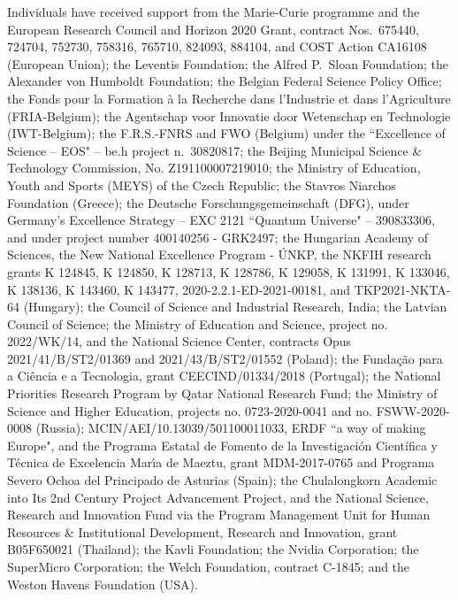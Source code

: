 \documentclass[11pt,twoside,a4paper]{cms-tdr}
\begin{document}
\begin{itemize}
    Individuals have received support from the Marie-Curie programme and the European Research Council and Horizon 2020 Grant, contract Nos.\ 675440, 724704, 752730, 758316, 765710, 824093, 884104, and COST Action CA16108 (European Union); the Leventis Foundation; the Alfred P.\ Sloan Foundation; the Alexander von Humboldt Foundation; the Belgian Federal Science Policy Office; the Fonds pour la Formation \`a la Recherche dans l'Industrie et dans l'Agriculture (FRIA-Belgium); the Agentschap voor Innovatie door Wetenschap en Technologie (IWT-Belgium); the F.R.S.-FNRS and FWO (Belgium) under the ``Excellence of Science -- EOS" -- be.h project n.\ 30820817; the Beijing Municipal Science \& Technology Commission, No. Z191100007219010; the Ministry of Education, Youth and Sports (MEYS) of the Czech Republic; the Stavros Niarchos Foundation (Greece); the Deutsche Forschungsgemeinschaft (DFG), under Germany's Excellence Strategy -- EXC 2121 ``Quantum Universe" -- 390833306, and under project number 400140256 - GRK2497; the Hungarian Academy of Sciences, the New National Excellence Program - \'UNKP, the NKFIH research grants K 124845, K 124850, K 128713, K 128786, K 129058, K 131991, K 133046, K 138136, K 143460, K 143477, 2020-2.2.1-ED-2021-00181, and TKP2021-NKTA-64 (Hungary); the Council of Science and Industrial Research, India; the Latvian Council of Science; the Ministry of Education and Science, project no. 2022/WK/14, and the National Science Center, contracts Opus 2021/41/B/ST2/01369 and 2021/43/B/ST2/01552 (Poland); the Funda\c{c}\~ao para a Ci\^encia e a Tecnologia, grant CEECIND/01334/2018 (Portugal); the National Priorities Research Program by Qatar National Research Fund; the Ministry of Science and Higher Education, projects no. 0723-2020-0041 and no. FSWW-2020-0008 (Russia); MCIN/AEI/10.13039/501100011033, ERDF ``a way of making Europe", and the Programa Estatal de Fomento de la Investigaci{\'o}n Cient{\'i}fica y T{\'e}cnica de Excelencia Mar\'{\i}a de Maeztu, grant MDM-2017-0765 and Programa Severo Ochoa del Principado de Asturias (Spain); the Chulalongkorn Academic into Its 2nd Century Project Advancement Project, and the National Science, Research and Innovation Fund via the Program Management Unit for Human Resources \& Institutional Development, Research and Innovation, grant B05F650021 (Thailand); the Kavli Foundation; the Nvidia Corporation; the SuperMicro Corporation; the Welch Foundation, contract C-1845; and the Weston Havens Foundation (USA).


\end{itemize}
\end{document}
